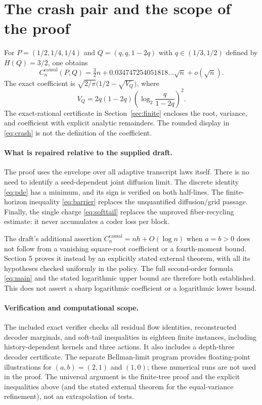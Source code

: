 \documentclass[11pt,a4paper]{article}
\newcommand{\causal}{\mathrm{causal}}
\begin{document}
\section{The crash pair and the scope of the proof}
For $P=(1/2,1/4,1/4)$ and $Q=(q,q,1-2q)$ with
$q\in(1/3,1/2)$ defined by $H(Q)=3/2$, one obtains
\begin{equation}\label{eq:crash}
\boxed{C_n^{\causal}(P,Q)
=\tfrac32n+0.034747254051818\ldots\sqrt n+o(\sqrt n).}
\end{equation}
The exact coefficient is
$\sqrt{2/\pi}\bigl(1/2-\sqrt{V_Q}\bigr)$, where
\[
V_Q=2q(1-2q)\left(\log_2\frac q{1-2q}\right)^2.
\]
The exact-rational certificate in Section~\ref{sec:finite} encloses the
root, variance, and coefficient with explicit analytic remainders.
The rounded display in \eqref{eq:crash} is not the definition of the
coefficient.

\paragraph{What is repaired relative to the supplied draft.}
The proof uses the envelope over all adaptive transcript laws itself.
There is no need to identify a seed-dependent joint diffusion limit.
The discrete identity \eqref{eq:pde} has a minimum, and its sign is
verified on both half-lines. The finite-horizon inequality
\eqref{eq:barrier} replaces the unquantified diffusion/grid passage.
Finally, the single charge \eqref{eq:softtail} replaces the unproved
fiber-recycling estimate: it never accumulates a coder loss per block.

The draft's additional assertion $C_n^{\causal}=nh+O(\log n)$ when
$a=b>0$ does not follow from a vanishing square-root coefficient or a
fourth-moment bound. Section 5 proves it instead by an explicitly stated
external theorem, with all its hypotheses checked uniformly in the
policy. The full second-order formula \eqref{eq:main} and the stated
logarithmic upper bound are therefore both established. This does not
assert a sharp logarithmic coefficient or a logarithmic lower bound.

\paragraph{Verification and computational scope.}
The included exact verifier checks all residual flow identities,
reconstructed decoder marginals, and soft-tail inequalities in eighteen
finite instances, including history-dependent kernels and three
actions. It also includes a depth-three decoder certificate.
The separate Bellman-limit program provides floating-point
illustrations for $(a,b)=(2,1)$ and $(1,0)$; these numerical runs are
not used in the proof. The universal argument is the finite-tree proof
and the explicit inequalities above (and the stated external theorem for
the equal-variance refinement), not an extrapolation of tests.
\end{document}
